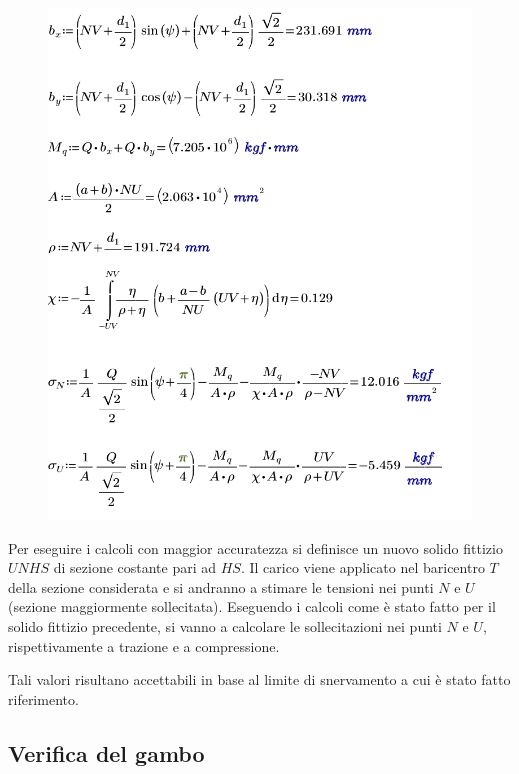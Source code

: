 \begin{figure}[H]
\centering
  \includegraphics[width=.44\textwidth]{imgs/Mathcad5}
\caption{}
\label{fig:Mathcad5}
\end{figure}
Per eseguire i calcoli con maggior accuratezza si definisce un nuovo solido fittizio $UNHS$ di sezione costante pari ad $HS$. Il carico viene applicato nel baricentro $T$ della sezione considerata e si andranno a stimare le tensioni nei punti $N$ e $U$ (sezione maggiormente sollecitata).
Eseguendo i calcoli come è stato fatto per il solido fittizio precedente, si vanno a calcolare le sollecitazioni nei punti $N$ e $U$, rispettivamente a trazione e a compressione.

Tali valori risultano accettabili in base al limite di snervamento a cui è stato fatto riferimento. 
\clearpage
\subsection{Verifica del gambo}

